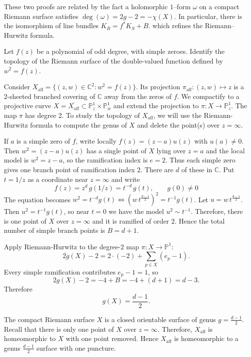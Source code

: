 \documentclass[12pt]{article}
\begin{document}
\begin{remark}
These two proofs are related by the fact a holomorphic $1$--form $\omega$ on a compact Riemann surface satisfies
$\deg(\omega) = 2g-2 = -\chi(X)$. In particular, there is the isomorphism of line bundles
$K_R = f^*K_S + B$.
which refines the Riemann--Hurwitz formula. 
\end{remark}


\begin{exercise}
Let $f(z)$ be a polynomial of odd degree, with simple zeroes. Identify the topology of the Riemann surface of the double-valued function defined by $w^2 = f(z)$.
\end{exercise}



\begin{solution}
    Consider $X_{\mathrm{aff}} = \{(z,w)\in\mathbb{C}^2 : w^2 = f(z)\}$. Its projection $\pi_{\mathrm{aff}} : (z,w) \mapsto z$ is a $2$-sheeted branched covering of $\mathbb{C}$ away from the zeros of $f$. We compactify to a projective curve $X = \overline{X_{\mathrm{aff}}} \subset \mathbb{P}^1_z \times \mathbb{P}^1_w$ and extend the projection to $\pi : X \longrightarrow \mathbb{P}^1_z$. The map $\pi$ has degree $2$.
    To study the topology of $X_{\mathrm{aff}}$, we will use the Riemann-Hurwitz formula to compute the genus of $X$ and delete the point(s) over $z=\infty$.



    If $a$ is a simple zero of $f$, write locally $f(z) = (z-a)u(z)$ with $u(a)\neq 0$. Then $w^2 = (z-a)u(z)$ has a single point of $X$ lying over $z=a$ and the local model is $w^2 = z-a$, so the ramification index is $e=2$. Thus each simple zero gives one branch point of ramification index $2$. There are $d$ of these in $\mathbb{C}$. Put $t=1/z$ as a coordinate near $z=\infty$ and write
    \[f(z) = z^{d}\,g(1/z) = t^{-d}\,g(t), \qquad g(0)\neq 0\]
    The equation becomes
    $w^2 = t^{-d}g(t) \Longleftrightarrow (w\,t^{\frac{d-1}{2}})^2 = t^{-1}g(t)$.
    Let $u = w\,t^{\frac{d-1}{2}}$. Then $u^2 = t^{-1}g(t)$, so near $t=0$ we have the model $u^2 \sim t^{-1}$. Therefore, there is one point of $X$ over $z=\infty$ and it is ramified of order $2$. Hence the total number of simple branch points is $B = d+1$.

    Apply Riemann-Hurwitz to the degree-$2$ map $\pi : X \to \mathbb{P}^1$:
    \[
        2g(X)-2 = 2\cdot(-2) + \sum_{p\in X}(e_p-1).
    \]
    Every simple ramification contributes $e_p-1=1$, so
    \[
        2g(X)-2 = -4 + B = -4 + (d+1) = d-3.
    \]
    Therefore
    \[
        g(X) = \frac{d-1}{2}.
    \]

    The compact Riemann surface $X$ is a closed orientable surface of genus $g = \frac{d-1}{2}$. Recall that there is only one point of $X$ over $z=\infty$. Therefore, $X_{\mathrm{aff}}$ is homeomorphic to $X$ with one point removed. Hence $X_{\mathrm{aff}}$ is homeomorphic to a genus $\frac{d-1}{2}$ surface with one puncture.
\end{solution}
\end{document}
